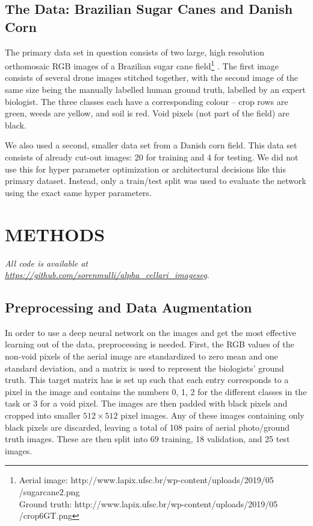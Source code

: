 \documentclass{article}
\begin{document}
\subsection{The Data: Brazilian Sugar Canes and Danish Corn}
The primary data set in question consists of two large, high resolution orthomosaic RGB images of a Brazilian sugar cane field\footnote{Aerial image: http://www.lapix.ufsc.br/wp-content/uploads/2019/05\\/sugarcane2.png\\
Ground truth: http://www.lapix.ufsc.br/wp-content/uploads/2019/05\\/crop6GT.png} \cite{brazil}.
The first image consists of several drone images stitched together, with the second image of the same size being the manually labelled human ground truth, labelled by an expert biologist.
The three classes each have a corresponding colour -- crop rows are green, weeds are yellow, and soil is red.
Void pixels (not part of the field) are black.

We also used a second, smaller data set from a Danish corn field. This data set consists of already cut-out images: 20 for training and 4 for testing.
We did not use this for hyper parameter optimization or architectural decisions like this primary dataset.
Instead, only a train/test split was used to evaluate the network using the exact same hyper parameters. 





\section{METHODS}
\label{sec:format}
\textit{All code is available at\\ \url{https://github.com/sorenmulli/alpha_cellari_imageseg}}.
\subsection{Preprocessing and Data Augmentation}
In order to use a deep neural network on the images and get the most effective learning out of the data, preprocessing is needed.
First, the RGB values of the non-void pixels of the aerial image are standardized to zero mean and one standard deviation, and a matrix is used to represent the biologists' ground truth.
This target matrix has is set up such that each entry corresponds to a pixel in the image and contains the numbers 0, 1, 2 for the different classes in the task or 3 for a void pixel.
The images are then padded with black pixels and cropped into smaller $ 512\times 512 $ pixel images.
Any of these images containing only black pixels are discarded, leaving a total of 108 pairs of aerial photo/ground truth images.
These are then split into 69 training, 18 validation, and 25 test images.
\end{document}
